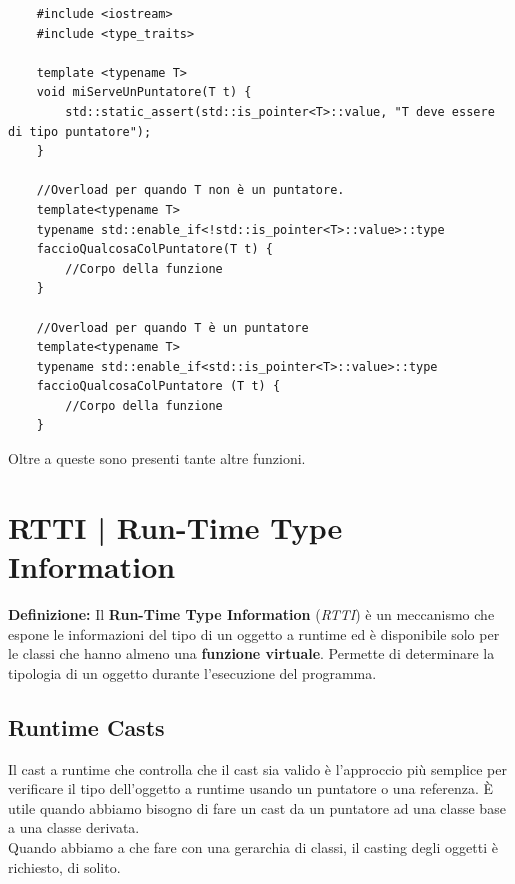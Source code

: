 \begin{lstlisting}
	#include <iostream>
	#include <type_traits>
	
	template <typename T>
	void miServeUnPuntatore(T t) {
		std::static_assert(std::is_pointer<T>::value, "T deve essere di tipo puntatore");
	}
	
	//Overload per quando T non è un puntatore.
	template<typename T>
	typename std::enable_if<!std::is_pointer<T>::value>::type
	faccioQualcosaColPuntatore(T t) {
		//Corpo della funzione
	}
	
	//Overload per quando T è un puntatore
	template<typename T>
	typename std::enable_if<std::is_pointer<T>::value>::type 
	faccioQualcosaColPuntatore (T t) {
		//Corpo della funzione
	}
\end{lstlisting}

\textsf{\small Oltre a queste sono presenti tante altre funzioni.} \\



\section{RTTI | Run-Time Type Information}

\textsf{\small \textbf{Definizione: } Il \textbf{Run-Time Type Information} (\emph{RTTI}) è un meccanismo che espone le informazioni del tipo di un oggetto a runtime ed è disponibile solo per le classi che hanno almeno una \textbf{funzione virtuale}. Permette di determinare la tipologia di un oggetto durante l'esecuzione del programma.} \\

\subsection{Runtime Casts}

\textsf{\small Il cast a runtime che controlla che il cast sia valido è l'approccio più semplice per verificare il tipo dell'oggetto a runtime usando un puntatore o una referenza. È utile quando abbiamo bisogno di fare un cast da un puntatore ad una classe base a una classe derivata.} \\

\textsf{\small Quando abbiamo a che fare con una gerarchia di classi, il casting degli oggetti è richiesto, di solito.} \\

